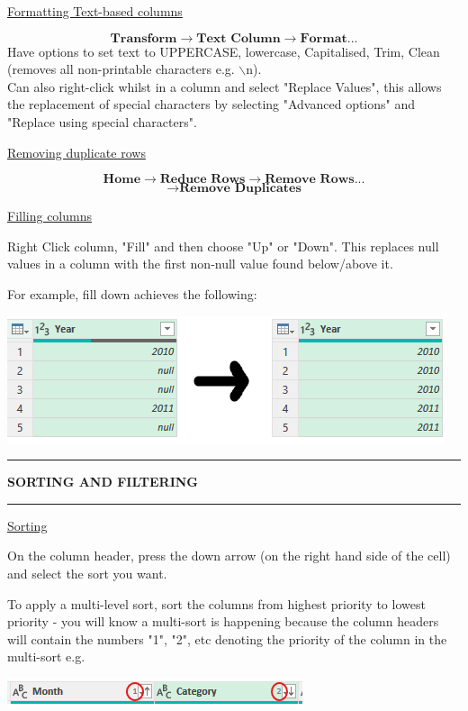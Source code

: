 \documentclass[8pt]{extarticle}
\newcommand{\heading}[1]{%
    \noindent
    \rule{\linewidth}{0.4pt}
    \begin{center}
        \vspace{-1ex}
        \textbf{#1}        
        \vspace{-2.5ex}
    \end{center}
    \rule{\linewidth}{0.4pt}
}
\begin{document}
\begin{multicols}{3}
\begin{center}
    \underline{Formatting Text-based columns}
\end{center}
\[\textbf{Transform} \rightarrow \textbf{Text Column} \rightarrow \textbf{Format...}\]
Have options to set text to UPPERCASE, lowercase, Capitalised, Trim, Clean (removes all non-printable characters e.g. $\backslash$n).\\

Can also right-click whilst in a column and select "Replace Values", this allows the replacement of special characters by selecting "Advanced options" and "Replace using special characters".

\begin{center}
    \underline{Removing duplicate rows}
\end{center}
\[\textbf{Home} \rightarrow \textbf{Reduce Rows} \rightarrow \textbf{Remove Rows...}\]\[ \rightarrow \textbf{Remove Duplicates}\]

\begin{center}
    \underline{Filling columns}
\end{center}
Right Click column, "Fill" and then choose "Up" or "Down". This replaces null values in a column with the first non-null value found below/above it.

For example, fill down achieves the following:
\begin{center}
    \includegraphics[width=0.9\columnwidth]{images/filldown.png}
\end{center}

\columnbreak
\heading{SORTING AND FILTERING}

\begin{center}
    \underline{Sorting}
\end{center}

On the column header, press the down arrow (on the right hand side of the cell) and select the sort you want. 

To apply a multi-level sort, sort the columns from highest priority to lowest priority - you will know a multi-sort is happening because the column headers will contain the numbers "1", "2", etc denoting the priority of the column in the multi-sort e.g. 
\begin{center}
    \includegraphics[width=\columnwidth]{images/multi-level-sort.png}
\end{center}


\end{multicols}
\end{document}
